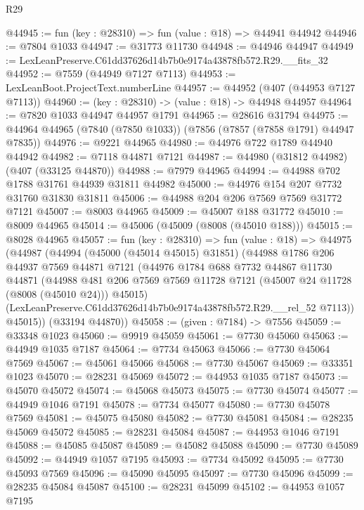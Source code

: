 \begin{lexlean}{R29}
\begin{coremodule}
@44945 := fun (key : @28310) => fun (value : @18) => @44941 @44942
@44946 := @7804 @1033
@44947 := @31773 @11730
@44948 := @44946 @44947
@44949 := LexLeanPreserve.C61dd37626d14b7b0e9174a43878fb572.R29.__fits_32
@44952 := @7559 (@44949 @7127 @7113)
@44953 := LexLeanBoot.ProjectText.numberLine
@44957 := @44952 (@407 (@44953 @7127 @7113))
@44960 := (key : @28310) -> (value : @18) -> @44948 @44957
@44964 := @7820 @1033 @44947 @44957 @1791
@44965 := @28616 @31794
@44975 := @44964 @44965 (@7840 (@7850 @1033)) (@7856 (@7857 (@7858 @1791) @44947 @7835))
@44976 := @9221 @44965
@44980 := @44976 @722 @1789 @44940 @44942
@44982 := @7118 @44871 @7121
@44987 := @44980 (@31812 @44982) (@407 (@33125 @44870))
@44988 := @7979 @44965
@44994 := @44988 @702 @1788 @31761 @44939 @31811 @44982
@45000 := @44976 @154 @207 @7732 @31760 @31830 @31811
@45006 := @44988 @204 @206 @7569 @7569 @31772 @7121
@45007 := @8003 @44965
@45009 := @45007 @188 @31772
@45010 := @8009 @44965
@45014 := @45006 (@45009 (@8008 (@45010 @188)))
@45015 := @8028 @44965
@45057 := fun (key : @28310) =>
  fun (value : @18) =>
  @44975
    (@44987
      (@44994
        (@45000 (@45014 @45015) @31851)
        (@44988
          @1786
          @206
          @44937
          @7569
          @44871
          @7121
          (@44976
            @1784
            @688
            @7732
            @44867
            @11730
            @44871
            (@44988
              @481
              @206
              @7569
              @7569
              @11728
              @7121
              (@45007 @24 @11728 (@8008 (@45010 @24)))
              @45015)
            (LexLeanPreserve.C61dd37626d14b7b0e9174a43878fb572.R29.__rel_52 @7113))
          @45015))
      (@33194 @44870))
@45058 := (given : @7184) -> @7556
@45059 := @33348 @1023
@45060 := @9919 @45059
@45061 := @7730 @45060
@45063 := @44949 @1035 @7187
@45064 := @7734 @45063
@45066 := @7730 @45064 @7569
@45067 := @45061 @45066
@45068 := @7730 @45067
@45069 := @33351 @1023
@45070 := @28231 @45069
@45072 := @44953 @1035 @7187
@45073 := @45070 @45072
@45074 := @45068 @45073
@45075 := @7730 @45074
@45077 := @44949 @1046 @7191
@45078 := @7734 @45077
@45080 := @7730 @45078 @7569
@45081 := @45075 @45080
@45082 := @7730 @45081
@45084 := @28235 @45069 @45072
@45085 := @28231 @45084
@45087 := @44953 @1046 @7191
@45088 := @45085 @45087
@45089 := @45082 @45088
@45090 := @7730 @45089
@45092 := @44949 @1057 @7195
@45093 := @7734 @45092
@45095 := @7730 @45093 @7569
@45096 := @45090 @45095
@45097 := @7730 @45096
@45099 := @28235 @45084 @45087
@45100 := @28231 @45099
@45102 := @44953 @1057 @7195

\end{coremodule}
\end{lexlean}
